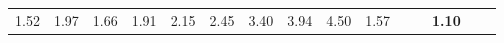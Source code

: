 \begin{tabular}{ll|rrrrrrrrr|rrrr}
  


  
  1.52 & 1.97 & 1.66 & 1.91 & 2.15 & 2.45 & 3.40 & 3.94 & 4.50 & 1.57 &  &  & \textbf{1.10} \\


\end{tabular}
